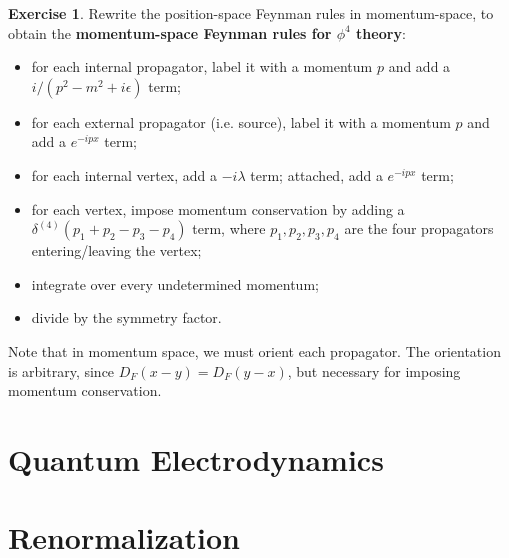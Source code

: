 \documentclass{report}
\theoremstyle{plain}
\theoremstyle{definition}
\newtheorem{exercise}{Exercise}[section]
\theoremstyle{remark}
\begin{document}
\begin{exercise}
  Rewrite the position-space Feynman rules in momentum-space, to
  obtain the {\bf momentum-space Feynman rules for $\phi^4$ theory}:
  \begin{itemize}
  \item for each internal propagator, label it with a momentum $p$ and
    add a $i/(p^2 - m^2 + i\epsilon)$ term;
  \item for each external propagator (i.e. source), label it with a
    momentum $p$ and add a $e^{-ipx}$ term;
  \item for each internal vertex, add a $-i\lambda$ term;
    attached, add a $e^{-ipx}$ term;
  \item for each vertex, impose momentum conservation by adding a
    $\delta^{(4)}(p_1 + p_2 - p_3 - p_4)$ term, where
    $p_1, p_2, p_3, p_4$ are the four propagators entering/leaving the
    vertex;
  \item integrate over every undetermined momentum;
  \item divide by the symmetry factor.
  \end{itemize}
  Note that in momentum space, we must orient each propagator. The
  orientation is arbitrary, since $D_F(x - y) = D_F(y - x)$, but
  necessary for imposing momentum conservation.
\end{exercise}

\chapter{Quantum Electrodynamics}



\chapter{Renormalization}
\end{document}
